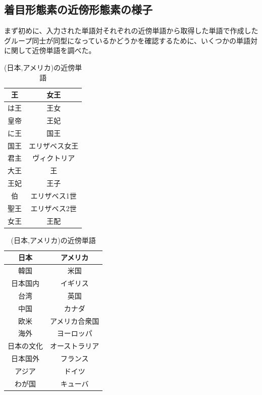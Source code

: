 \subsection{着目形態素の近傍形態素の様子}
まず初めに、入力された単語対それぞれの近傍単語から取得した単語で作成したグループ同士が同型になっているかどうかを確認するために、いくつかの単語対に関して近傍単語を調べた。

\begin{table}[h]
  \begin{minipage}[t]{.45\textwidth}
    \caption[(王,女王)]{(王,女王)の近傍単語}
    \label{kq_table}
    \begin{center}
      \begin{tabular}{|c|c|} \hline
        王 & 女王 \\ \hline
        は王 & 王女 \\
        皇帝 & 王妃 \\
        に王 & 国王 \\
        国王 & エリザベス女王 \\
        君主 & ヴィクトリア \\
        大王 & 王 \\
        王妃 & 王子 \\
        伯 & エリザベス1世 \\
        聖王 & エリザベス2世 \\
        女王 & 王配 \\ \hline
      \end{tabular}
    \end{center}
  \end{minipage}
  \hfill
  \begin{minipage}[t]{.45\textwidth}
    \caption[(日本,アメリカ)]{(日本,アメリカ)の近傍単語}
    \begin{center}
      \begin{tabular}{|c|c|} \hline
        日本 & アメリカ \\ \hline
        韓国 & 米国 \\
        日本国内 & イギリス \\
        台湾 & 英国 \\
        中国 & カナダ \\
        欧米 & アメリカ合衆国 \\
        海外 & ヨーロッパ \\
        日本の文化 & オーストラリア \\
        日本国外 & フランス \\
        アジア & ドイツ \\
        わが国 & キューバ \\ \hline
      \end{tabular}
    \end{center}
  \end{minipage}
\end{table}

